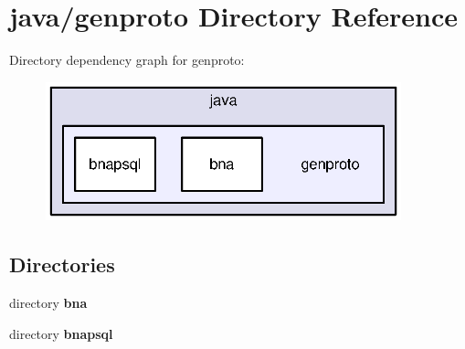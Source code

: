 \section{java/genproto Directory Reference}
\label{dir_0e43b3eaa74cb4b3a4cbe492a3c2d8cb}
Directory dependency graph for genproto\+:\nopagebreak
\begin{figure}[H]
\begin{center}
\leavevmode
\includegraphics[width=292pt]{dir_0e43b3eaa74cb4b3a4cbe492a3c2d8cb_dep}
\end{center}
\end{figure}
\subsection*{Directories}
\begin{DoxyCompactItemize}
\item 
directory {\bf bna}
\item 
directory {\bf bnapsql}
\end{DoxyCompactItemize}
